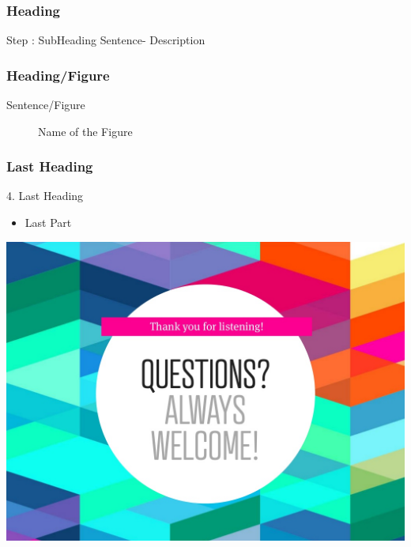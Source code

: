 \documentclass{beamer}
\begin{document}
\begin{frame}
\frametitle{Heading }

\begin{block}{Step : SubHeading}
Sentence- Description
\end{block}
\end{frame}




\begin{frame}
\frametitle{Heading/Figure}
Sentence/Figure
\begin{figure}
  \caption{Name of the Figure }\label{fig:digit}
\end{figure}
\end{frame}


\begin{frame}
\frametitle{Last Heading }

4. Last Heading

\begin{itemize}
\item Last Part
\end{itemize}
\end{frame}


\begin{frame}

\begin{center}
\includegraphics[width=0.8\linewidth]{picture.jpeg}

\end{center}

\end{frame}

\end{document}
